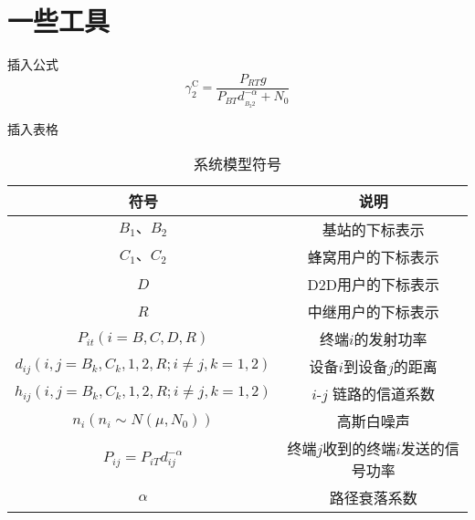 \documentclass[UTF8,12pt]{ctexart}
\newcommand{\wuhao}{\fontsize{10.5pt}{10.5pt}\selectfont}
\begin{document}
\section{一些工具}
插入公式
\begin{equation}\label{eq}
    \gamma _2^{\text{C}} = \frac{{{P_{RT}}g}}{{{P_{BT}}d_{_{{B_2}2}}^{ - \alpha } + {N_0}}}
\end{equation}


插入表格
\begin{table}[H] \wuhao             %
    \centering
    \caption{系统模型符号}\label{tab}
    \begin{tabular}{c|c}
        \toprule                  %
        符号                                                           & 说明                               \\
        \hline                  %
        ${{B_1}\mbox{、}{B_2}}$                                        & 基站的下标表示                     \\
        ${C_1}\mbox{、}{C_2}$                                          & 蜂窝用户的下标表示                 \\
        $D$                                                            & D2D用户的下标表示                  \\
        $R$                                                            & 中继用户的下标表示                 \\
        ${P_{it}}\left( {i = B,C,D,R} \right)$                         & 终端$i$的发射功率                  \\
        ${d_{ij}}(i,j = {B_k},{C_k},1,2,R;i \ne j,k = 1,2)$            & 设备$i$到设备$j$的距离             \\
        ${h_{ij}}(i,j = {B_k},{C_k},1,2,R;i \ne j,k = 1,2)$            & $i$-$j$ 链路的信道系数             \\
        ${n_i}\left( {{n_i}\sim N\left( {\mu ,{N_0}} \right)} \right)$ & 高斯白噪声                         \\
        ${P_{ij}} = {P_{iT}}d_{ij}^{ - \alpha }$                       & 终端$j$收到的终端$i$发送的信号功率 \\
        $\alpha$                                                       & 路径衰落系数                       \\
        \bottomrule                %
    \end{tabular}
\end{table}
\end{document}

